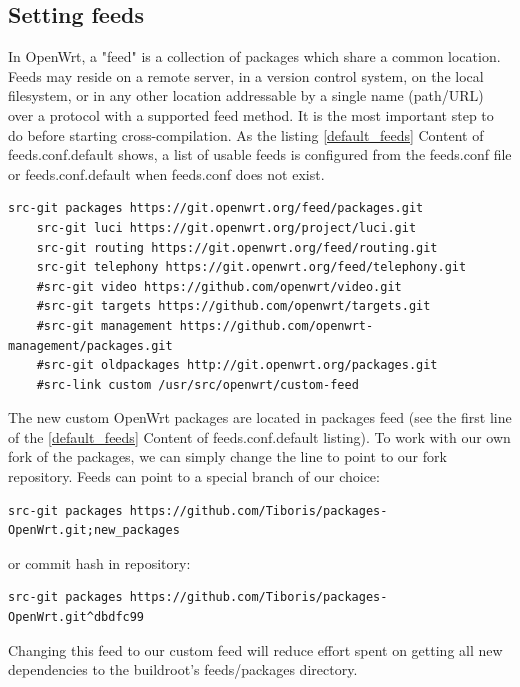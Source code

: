 \subsection{Setting feeds}

In OpenWrt, a "feed" is a collection of packages which share a common location.
Feeds may reside on a remote server, in a version control system, on the local filesystem, or in any other location addressable by a single name (path/URL) over a protocol with a supported feed method.
It is the most important step to do before starting cross-compilation.
As the listing \ref{default_feeds} Content of feeds.conf.default shows, a list of usable feeds is configured from the feeds.conf file or feeds.conf.default when feeds.conf does not exist.

\begin{lstlisting}[columns=fixed,basicstyle=\ttfamily\footnotesize,tabsize=4,label=default_feeds,caption=Content of feeds.conf.default]
    src-git packages https://git.openwrt.org/feed/packages.git
    src-git luci https://git.openwrt.org/project/luci.git
    src-git routing https://git.openwrt.org/feed/routing.git
    src-git telephony https://git.openwrt.org/feed/telephony.git
    #src-git video https://github.com/openwrt/video.git
    #src-git targets https://github.com/openwrt/targets.git
    #src-git management https://github.com/openwrt-management/packages.git
    #src-git oldpackages http://git.openwrt.org/packages.git
    #src-link custom /usr/src/openwrt/custom-feed
\end{lstlisting}

The new custom OpenWrt packages are located in packages feed (see the first line of the \ref{default_feeds} Content of feeds.conf.default listing).
To work with our own fork of the packages, we can simply change the line to point to our fork repository.
Feeds can point to a special branch of our choice:
\begin{lstlisting}[columns=fixed,basicstyle=\ttfamily\footnotesize,tabsize=4,backgroundcolor=\color{yellow!10}]
src-git packages https://github.com/Tiboris/packages-OpenWrt.git;new_packages
\end{lstlisting}
or commit hash in repository:
\begin{lstlisting}[columns=fixed,basicstyle=\ttfamily\footnotesize,tabsize=4,backgroundcolor=\color{yellow!10}]
src-git packages https://github.com/Tiboris/packages-OpenWrt.git^dbdfc99
\end{lstlisting}
Changing this feed to our custom feed will reduce effort spent on getting all new dependencies to the buildroot's feeds/packages directory. %

